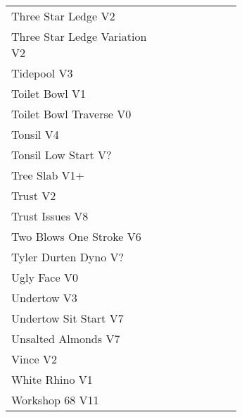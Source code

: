 \begin{flushleft}
\begin{center}
\begin{supertabular}{p{0.65\linewidth}r}
Three Star Ledge V2 & \pageref{rt:Three Star Ledge} \\
Three Star Ledge Variation V2 & \pageref{vr:Three Star Ledge Variation} \\
Tidepool V3 & \pageref{rt:Tidepool} \\
Toilet Bowl V1 & \pageref{rt:Toilet Bowl} \\
Toilet Bowl Traverse V0 & \pageref{rt:Toilet Bowl Traverse} \\
Tonsil V4 & \pageref{rt:Tonsil} \\
Tonsil Low Start V? & \pageref{vr:Tonsil Low Start} \\
Tree Slab V1+ & \pageref{rt:Tree Slab} \\
Trust V2 & \pageref{rt:Trust} \\
Trust Issues V8 & \pageref{rt:Trust Issues} \\
Two Blows One Stroke V6 & \pageref{rt:Two Blows One Stroke} \\
Tyler Durten Dyno V? & \pageref{vr:Tyler Durten Dyno} \\
Ugly Face V0 & \pageref{rt:Ugly Face} \\
Undertow V3 & \pageref{rt:Undertow} \\
Undertow Sit Start V7 & \pageref{vr:Undertow Sit Start} \\
Unsalted Almonds V7 & \pageref{rt:Unsalted Almonds} \\
Vince V2 & \pageref{rt:Vince} \\
White Rhino V1 & \pageref{rt:White Rhino} \\
Workshop 68 V11 & \pageref{rt:Workshop 68} \\
\end{supertabular}
\end{center}

\end{flushleft}
